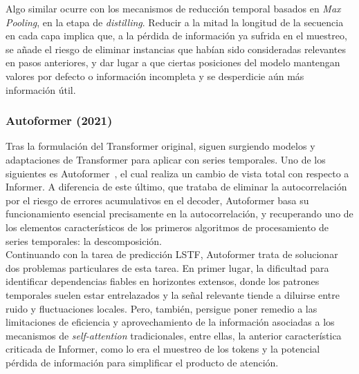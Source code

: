 Algo similar ocurre con los mecanismos de reducción temporal basados en \textit{Max Pooling}, en la etapa de \textit{distilling}. Reducir a la mitad la longitud de la secuencia en cada capa implica que, a la pérdida de información ya sufrida en el muestreo, se añade el riesgo de eliminar instancias que habían sido consideradas relevantes en pasos anteriores, y dar lugar a que ciertas posiciones del modelo mantengan valores por defecto o información incompleta y se desperdicie aún más información útil.

\subsubsection{Autoformer (2021)}

Tras la formulación del Transformer original, siguen surgiendo modelos y adaptaciones de Transformer para aplicar con series temporales. Uno de los siguientes es Autoformer~\cite{wu2022autoformerdecompositiontransformersautocorrelation}, el cual realiza un cambio de vista total con respecto a Informer. A diferencia de este último, que trataba de eliminar la autocorrelación por el riesgo de errores acumulativos en el decoder, Autoformer basa su funcionamiento esencial precisamente en la autocorrelación, y recuperando uno de los elementos característicos de los primeros algoritmos de procesamiento de series temporales: la descomposición.\\

Continuando con la tarea de predicción LSTF, Autoformer trata de solucionar dos problemas particulares de esta tarea. En primer lugar, la dificultad para identificar dependencias fiables en horizontes extensos, donde los patrones temporales suelen estar entrelazados y la señal relevante tiende a diluirse entre ruido y fluctuaciones locales. Pero, también, persigue poner remedio a las limitaciones de eficiencia y aprovechamiento de la información asociadas a los mecanismos de \textit{self-attention} tradicionales, entre ellas, la anterior característica criticada de Informer, como lo era el muestreo de los tokens y la potencial pérdida de información para simplificar el producto de atención.\\

